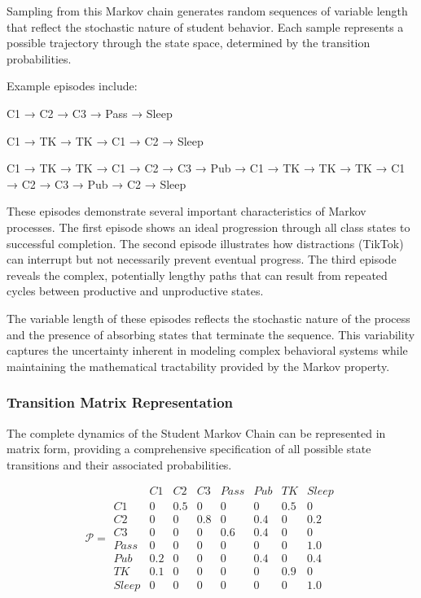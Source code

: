 Sampling from this Markov chain generates random sequences of variable length that reflect the stochastic nature of student behavior. Each sample represents a possible trajectory through the state space, determined by the transition probabilities.

Example episodes include:
\begin{compactitemize}
\item C1 → C2 → C3 → Pass → Sleep
\item C1 → TK → TK → C1 → C2 → Sleep  
\item C1 → TK → TK → C1 → C2 → C3 → Pub → C1 → TK → TK → TK → C1 → C2 → C3 → Pub → C2 → Sleep
\end{compactitemize}

These episodes demonstrate several important characteristics of Markov processes. The first episode shows an ideal progression through all class states to successful completion. The second episode illustrates how distractions (TikTok) can interrupt but not necessarily prevent eventual progress. The third episode reveals the complex, potentially lengthy paths that can result from repeated cycles between productive and unproductive states.

The variable length of these episodes reflects the stochastic nature of the process and the presence of absorbing states that terminate the sequence. This variability captures the uncertainty inherent in modeling complex behavioral systems while maintaining the mathematical tractability provided by the Markov property.


\subsubsection{Transition Matrix Representation}

The complete dynamics of the Student Markov Chain can be represented in matrix form, providing a comprehensive specification of all possible state transitions and their associated probabilities.

\begin{equation}
\mathcal{P} = \begin{array}{c|ccccccc}
 & C1 & C2 & C3 & Pass & Pub & TK & Sleep \\
\hline
C1 & 0 & 0.5 & 0 & 0 & 0 & 0.5 & 0 \\
C2 & 0 & 0 & 0.8 & 0 & 0.4 & 0 & 0.2 \\
C3 & 0 & 0 & 0 & 0.6 & 0.4 & 0 & 0 \\
Pass & 0 & 0 & 0 & 0 & 0 & 0 & 1.0 \\
Pub & 0.2 & 0 & 0 & 0 & 0.4 & 0 & 0.4 \\
TK & 0.1 & 0 & 0 & 0 & 0 & 0.9 & 0 \\
Sleep & 0 & 0 & 0 & 0 & 0 & 0 & 1.0
\end{array}
\end{equation}

